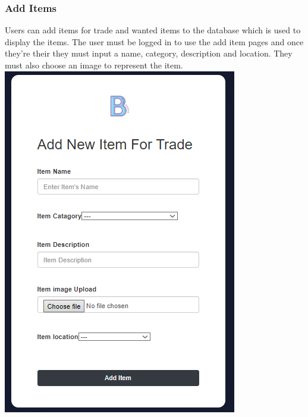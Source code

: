 \subsubsection{Add Items}
Users can add items for trade and wanted items to the database which is used to display the items. The user must be logged in to use the add item pages and once they're their they must input a name, category, description and location. They must also choose an image to represent the item.
\newline
\includegraphics[scale=.6]{img/fe_additem.PNG}

